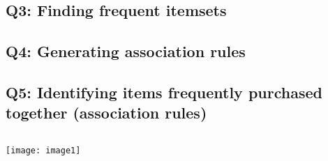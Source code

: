 \documentclass[]{article}
\begin{document}
\subsection*{Q3: Finding frequent itemsets}

\subsection*{Q4: Generating association rules}

\subsection*{Q5: Identifying items frequently purchased together (association rules)}


\begin{verbatim}

\end{verbatim}

\texttt{[image: image1]}
\end{document}
